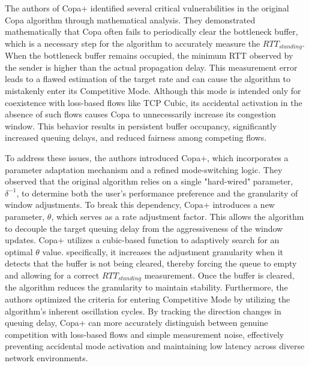 The authors of Copa+ identified several critical vulnerabilities in the original Copa algorithm through mathematical analysis\cite{COPAPLUS}. 
They demonstrated mathematically that Copa often fails to periodically clear the bottleneck buffer, which is a necessary step for the algorithm to accurately measure the $RTT_{standing}$\cite{COPAPLUS}. 
When the bottleneck buffer remains occupied, the minimum RTT observed by the sender is higher than the actual propagation delay\cite{COPAPLUS}. 
This measurement error leads to a flawed estimation of the target rate and can cause the algorithm to mistakenly enter its Competitive Mode\cite{COPAPLUS}. 
Although this mode is intended only for coexistence with loss-based flows like TCP Cubic, its accidental activation in the absence of such flows causes Copa to unnecessarily increase its congestion window\cite{COPAPLUS}. 
This behavior results in persistent buffer occupancy, significantly increased queuing delays, and reduced fairness among competing flows\cite{COPAPLUS}.

To address these issues, the authors introduced Copa+, which incorporates a parameter adaptation mechanism and a refined mode-switching logic\cite{COPAPLUS}. 
They observed that the original algorithm relies on a single "hard-wired" parameter, $\delta^{-1}$, to determine both the user's performance preference and the granularity of window adjustments\cite{COPAPLUS}. 
To break this dependency, Copa+ introduces a new parameter, $\theta$, which serves as a rate adjustment factor\cite{COPAPLUS}. 
This allows the algorithm to decouple the target queuing delay from the aggressiveness of the window updates\cite{COPAPLUS}. 
Copa+ utilizes a cubic-based function to adaptively search for an optimal $\theta$ value\cite{COPAPLUS}.
specifically, it increases the adjustment granularity when it detects that the buffer is not being cleared, thereby forcing the queue to empty and allowing for a correct $RTT_{standing}$ measurement\cite{COPAPLUS}. 
Once the buffer is cleared, the algorithm reduces the granularity to maintain stability\cite{COPAPLUS}. 
Furthermore, the authors optimized the criteria for entering Competitive Mode by utilizing the algorithm's inherent oscillation cycles\cite{COPAPLUS}. 
By tracking the direction changes in queuing delay, Copa+ can more accurately distinguish between genuine competition with loss-based flows and simple measurement noise, effectively preventing accidental mode activation and maintaining low latency across diverse network environments\cite{COPAPLUS}.

